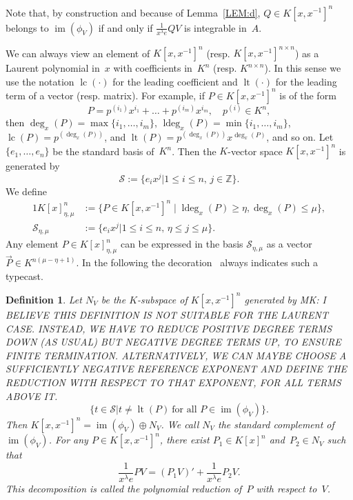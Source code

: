\documentclass[final,1p,times,authoryear]{elsarticle}
\newtheorem{defi}[theorem]{Definition}
\newcommand{\bZ}{ {\mathbb Z}}
\newcommand{\cS}{ {\mathcal S}}
\def\lc{\operatorname{lc}}
\def\lt{\operatorname{lt}}
\def\im{\operatorname{im}}
\begin{document}
Note that, by construction and because of Lemma~\ref{LEM:d}, $Q\in K[x,x^{-1}]^n$ belongs to
$\im(\phi_V)$ if and only if $\frac{1}{x^\lambda e}QV$ is integrable in~$A$. 

We can always view an element of $K[x,x^{-1}]^n$ (resp. $K[x,x^{-1}]^{n\times n}$) as a Laurent polynomial in~$x$
with coefficients in~$K^n$ (resp. $K^{n\times n}$). In this sense we use the notation $\lc(\cdot)$
for the leading coefficient and $\lt(\cdot)$ for the leading term of a vector (resp. matrix).
For example, if $P\in K[x,x^{-1}]^n$ is of the form
\[
  P = p^{(i_1)}x^{i_1} + \dots + p^{(i_m)}x^{i_m},\quad p^{(i)}\in K^n,
\]
\def\ldeg{\operatorname{ldeg}}%
then
$\deg_x(P)=\max\{i_1,\dots,i_m\}$,
$\ldeg_x(P)=\min\{i_1,\dots,i_m\}$, $\lc(P)=p^{(\deg_x(P))}$, and $\lt(P)=p^{(\deg_x(P))}x^{\deg_x(P)}$,
and so on.
Let $\{e_1, \ldots, e_n\}$ be the standard basis of~$K^n$.
Then the $K$-vector space $K[x,x^{-1}]^n$ is generated by
\[
  \cS := \bigl\{e_ix^j \mathrel{\big|} 1\leq i \leq n,\, j\in \bZ\bigr\}.
\]
We define
\begin{alignat*}1
  K[x]_{\eta,\mu}^n&:=\{P\in K[x,x^{-1}]^n \mid \ldeg_x(P)\geq\eta,\deg_x(P)\leq\mu\},\\
  \cS_{\eta,\mu}&:= \bigl\{e_ix^j \mathrel{\big|} 1\leq i \leq n,\, \eta\leq j\leq \mu\bigr\}.
\end{alignat*}
Any element $P\in K[x]_{\eta,\mu}^n$ can be expressed in the
basis $\cS_{\eta,\mu}$ as a vector $\vec{P}\in K^{n(\mu-\eta+1)}$.
In the following the decoration~\raisebox{-1pt}{$\vec{}\;$} always indicates
such a typecast.

\begin{defi}
  Let $N_V$ be the $K$-subspace of $K[x,x^{-1}]^n$ generated by
  MK: I BELIEVE THIS DEFINITION IS NOT SUITABLE FOR THE LAURENT CASE. INSTEAD, WE HAVE
  TO REDUCE POSITIVE DEGREE TERMS DOWN (AS USUAL) BUT NEGATIVE DEGREE TERMS UP, TO ENSURE
  FINITE TERMINATION. ALTERNATIVELY, WE CAN MAYBE CHOOSE A SUFFICIENTLY NEGATIVE REFERENCE
  EXPONENT AND DEFINE THE REDUCTION WITH RESPECT TO THAT EXPONENT, FOR ALL TERMS ABOVE IT.
\[
  \bigl\{t \in \cS \mathrel{\big|} t \neq \lt(P) \ \text{for all $P\in \im(\phi_V)$}\bigr\}.
\]
Then $K[x,x^{-1}]^n = \im(\phi_V) \oplus N_V$.
We call $N_V$ the \emph{standard complement} of $\im(\phi_V)$.
For any $P\in K[x,x^{-1}]^n$, there exist $P_1\in K[x]^n$ and~$P_2\in N_V$ such that
\[\frac{1}{x^\lambda e}PV = (P_1V)' + \frac{1}{x^\lambda e}P_2V.\]
This decomposition is called the \emph{polynomial reduction} of~$P$
with respect to~$V$.
\end{defi}
\end{document}
